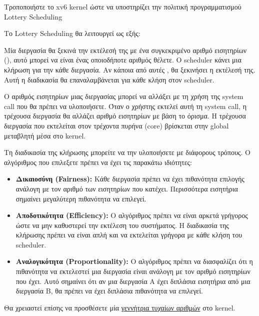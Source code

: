 \documentclass[18pt]{extarticle}
\begin{document}
\begin{question}
    Τροποποιήστε το xv6 kernel ώστε να υποστηρίζει την πολιτική προγραμματισμού Lottery Scheduling \cite{OSTEP-SchedLottery, LotteryScheduling1994}

    Το Lottery Scheduling θα λειτουργεί ως εξής:

    Μία διεργασία θα ξεκινά την εκτέλεσή της με ένα συγκεκριμένο αριθμό εισητηρίων (), αυτό μπορεί να είναι ένας οποιοδήποτε αριθμός θέλετε.
    Ο scheduler κάνει μια κλήρωση για την κάθε διεργασία. Αν κάποια από αυτές , θα ξεκινήσει η εκτέλεσή της.
    Αυτή η διαδικασία θα επαναλαμβάνεται για κάθε κλήση στον scheduler.

    Ο αριθμός εισητηρίων μιας διεργασίας μπορεί να αλλάξει με τη χρήση της system call  που θα πρέπει να υλοποιήσετε.
    Όταν ο χρήστης εκτελεί αυτή τη system call, η τρέχουσα διεργασία θα αλλάζει αριθμό εισητηρίων με βάση το όρισμα. Η τρέχουσα διεργασία 
    που εκτελείται στον τρέχοντα πυρήνα (core) βρίσκεται στην global μεταβλητή  μέσα στο kernel.

    Τη διαδικασία της κλήρωσης μπορείτε να την υλοποιήσετε με διάφορους τρόπους.
    Ο αλγόριθμος που επιλεξετε πρέπει να έχει τις παρακάτω ιδιότητες:
    \begin{itemize}
        \item \textbf{Δικαιοσύνη (Fairness):} Κάθε διεργασία πρέπει να έχει
            πιθανότητα επιλογής ανάλογη με τον αριθμό των εισητηρίων που
            κατέχει. Περισσότερα εισητήρια σημαίνει μεγαλύτερη πιθανότητα να
            επιλεγεί.
        \item \textbf{Αποδοτικότητα (Efficiency):} Ο αλγόριθμος πρέπει να είναι
            αρκετά γρήγορος ώστε να μην καθυστερεί την εκτέλεση του συστήματος.
            Η διαδικασία της κλήρωσης πρέπει να είναι απλή και να εκτελείται
            γρήγορα με κάθε κλήση του scheduler.
        \item \textbf{Αναλογικότητα (Proportionality):} Ο αλγόριθμος πρέπει να
            διασφαλίζει ότι η πιθανότητα να εκτελεστεί μια διεργασία είναι
            ανάλογη με τον αριθμό εισητηρίων που έχει. Αυτό σημαίνει ότι αν μια
            διεργασία Α έχει διπλάσια εισητήρια από μια διεργασία Β, θα πρέπει
            να έχει διπλάσια πιθανότητα να επιλεγεί.
    \end{itemize}


    Θα χρειαστεί επίσης να προσθέσετε μία \href{https://wiki.osdev.org/Random_Number_Generator#Pseudorandom_number_generators}{γεννήτρια τυχαίων αριθμών}
    στο kernel.


\end{question}
\end{document}
